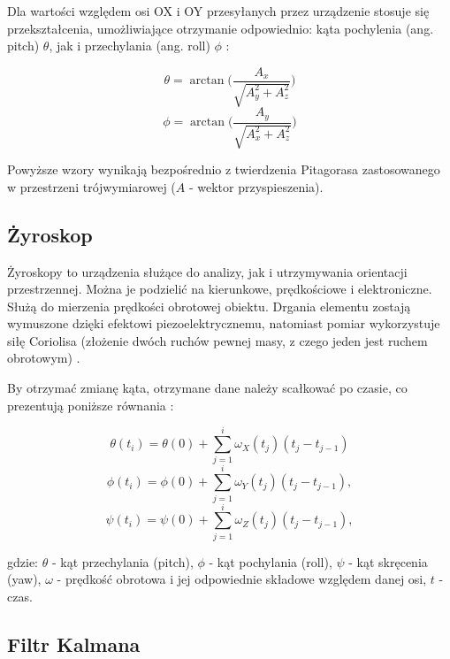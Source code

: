 \newpage

Dla wartości względem osi OX i OY przesyłanych przez urządzenie stosuje się przekształcenia, umożliwiające otrzymanie odpowiednio: kąta pochylenia (ang. pitch) $\theta$, jak i przechylania (ang. roll) $\phi$ :

\begin{equation}
    \theta = \arctan \Bigg( \frac{A_{x}}{\sqrt{A_{y}^{2} + A_{z}^{2}}} \Bigg)
\end{equation}
\begin{equation}
    \phi = \arctan \Bigg( \frac{A_{y}}{\sqrt{A_{x}^{2} + A_{z}^{2}}} \Bigg)
\end{equation}

Powyższe wzory wynikają bezpośrednio z twierdzenia Pitagorasa zastosowanego w przestrzeni trójwymiarowej ($A$ - wektor przyspieszenia).

\subsection{Żyroskop}

Żyroskopy to urządzenia służące do analizy, jak i utrzymywania orientacji przestrzennej. Można je podzielić na kierunkowe, prędkościowe i elektroniczne. Służą do mierzenia prędkości obrotowej obiektu. Drgania elementu zostają wymuszone dzięki efektowi piezoelektrycznemu, natomiast pomiar wykorzystuje siłę Coriolisa (złożenie dwóch ruchów pewnej masy, z czego jeden jest ruchem  obrotowym) \cite{filtr}.

By otrzymać zmianę kąta, otrzymane dane należy scałkować po czasie, co prezentują poniższe równania \cite{filtr}:

\begin{equation}
    \theta(t_{i}) = \theta(0) + \sum^{i}_{j=1} \omega_{X}(t_{j})(t_{j} - t_{j-1})
\end{equation}
\begin{equation}
    \phi(t_{i}) = \phi(0) + \sum^{i}_{j=1} \omega_{Y}(t_{j})(t_{j} - t_{j-1}),
\end{equation}
\begin{equation}
    \psi(t_{i}) = \psi(0) + \sum^{i}_{j=1} \omega_{Z}(t_{j})(t_{j} - t_{j-1}),
\end{equation}

\noindent gdzie: $\theta$ - kąt przechylania (pitch), $\phi$ - kąt pochylania (roll), $\psi$ - kąt skręcenia (yaw), $\omega$ - prędkość obrotowa i jej odpowiednie składowe względem danej osi, $t$ - czas.

\subsection{Filtr Kalmana}

